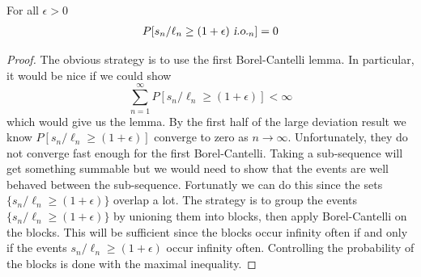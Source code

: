 \begin{lemma}
\label{LIIL: io lemma 1}
For all $\epsilon > 0 $
\begin{align*}
P[ s_n/\ell_n \geq  (1+\epsilon) {\,\,\text{\sl i.o.} }_n ] = 0
\end{align*}
\end{lemma}
\begin{proof}
The obvious strategy is to use the first Borel-Cantelli lemma. In particular, it would be nice if we could show
\[
\sum_{n=1}^\infty P [ s_n/\ell_n \geq  (1+\epsilon)]<\infty
\]
which would give us the lemma. By the first half of the large deviation result we know $P [ s_n/\ell_n \geq  (1+\epsilon)]$ converge to zero as $n\rightarrow \infty$. Unfortunately, they do not converge fast enough for the first Borel-Cantelli. Taking a sub-sequence will get something summable but we would need to show that the events are well behaved between the sub-sequence. Fortunatly we can do this since the sets $\{s_n/\ell_n \geq  (1+\epsilon)\}$ overlap a lot. The strategy is to group the events $\{s_n/\ell_n \geq  (1+\epsilon)\}$ by unioning them into blocks, then apply Borel-Cantelli on the blocks. This will be sufficient since  the blocks occur infinity often if and only if the events $s_n/\ell_n \geq  (1+\epsilon)$ occur infinity often.  Controlling the probability of the blocks is done with the maximal inequality.


\end{proof}
